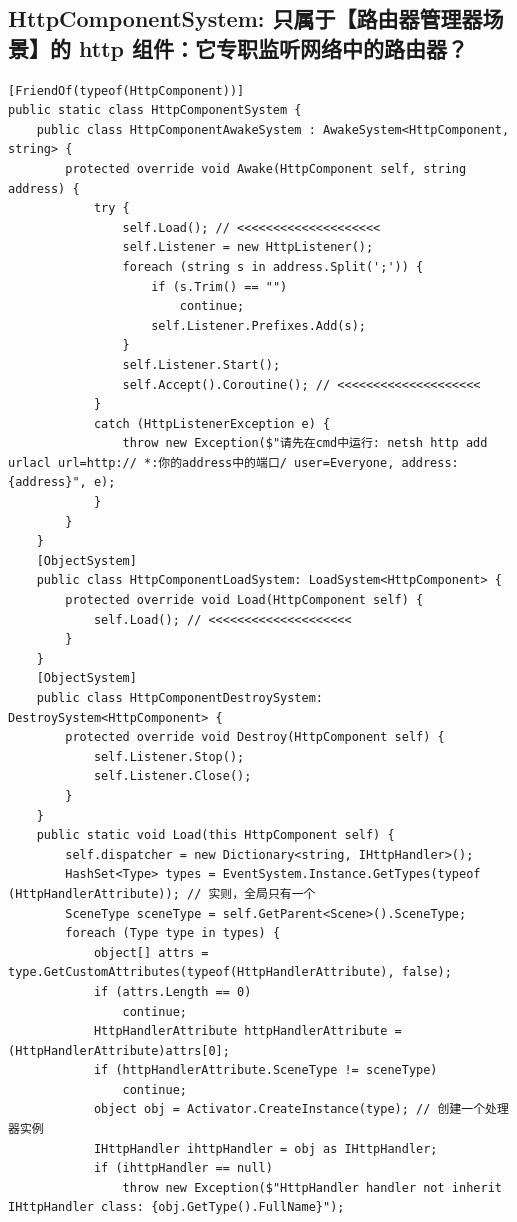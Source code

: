 \documentclass[9pt, b5paper]{article}
\begin{document}
\subsection{HttpComponentSystem: 只属于【路由器管理器场景】的 http 组件：它专职监听网络中的路由器？}
\label{sec-7-4}
\begin{verbatim}
[FriendOf(typeof(HttpComponent))]
public static class HttpComponentSystem {
    public class HttpComponentAwakeSystem : AwakeSystem<HttpComponent, string> {
        protected override void Awake(HttpComponent self, string address) {
            try {
                self.Load(); // <<<<<<<<<<<<<<<<<<<< 
                self.Listener = new HttpListener();
                foreach (string s in address.Split(';')) {
                    if (s.Trim() == "") 
                        continue;
                    self.Listener.Prefixes.Add(s);
                }
                self.Listener.Start();
                self.Accept().Coroutine(); // <<<<<<<<<<<<<<<<<<<< 
            }
            catch (HttpListenerException e) {
                throw new Exception($"请先在cmd中运行: netsh http add urlacl url=http:// *:你的address中的端口/ user=Everyone, address: {address}", e);
            }
        }
    }
    [ObjectSystem]
    public class HttpComponentLoadSystem: LoadSystem<HttpComponent> {
        protected override void Load(HttpComponent self) {
            self.Load(); // <<<<<<<<<<<<<<<<<<<< 
        }
    }
    [ObjectSystem]
    public class HttpComponentDestroySystem: DestroySystem<HttpComponent> {
        protected override void Destroy(HttpComponent self) {
            self.Listener.Stop();
            self.Listener.Close();
        }
    }
    public static void Load(this HttpComponent self) {
        self.dispatcher = new Dictionary<string, IHttpHandler>();
        HashSet<Type> types = EventSystem.Instance.GetTypes(typeof (HttpHandlerAttribute)); // 实则，全局只有一个
        SceneType sceneType = self.GetParent<Scene>().SceneType;
        foreach (Type type in types) {
            object[] attrs = type.GetCustomAttributes(typeof(HttpHandlerAttribute), false);
            if (attrs.Length == 0) 
                continue;
            HttpHandlerAttribute httpHandlerAttribute = (HttpHandlerAttribute)attrs[0];
            if (httpHandlerAttribute.SceneType != sceneType) 
                continue;
            object obj = Activator.CreateInstance(type); // 创建一个处理器实例
            IHttpHandler ihttpHandler = obj as IHttpHandler;
            if (ihttpHandler == null) 
                throw new Exception($"HttpHandler handler not inherit IHttpHandler class: {obj.GetType().FullName}");

\end{verbatim}
\end{document}
